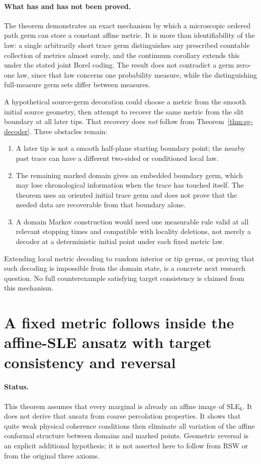 \documentclass[11pt]{article}
\theoremstyle{definition}\newtheorem{definition}[theorem]{Definition}
\theoremstyle{remark}\newtheorem{remark}[theorem]{Remark}
\begin{document}
\paragraph{What has and has not been proved.}
The theorem demonstrates an exact mechanism by which a microscopic ordered
path germ can store a constant affine metric. It is more than identifiability
of the law: a single arbitrarily short trace germ distinguishes any prescribed
countable collection of metrics almost surely, and the continuum corollary
extends this under the stated joint Borel coding. The result does not contradict
a germ zero-one law, since that law concerns one probability measure, while
the distinguishing full-measure germ sets differ between measures.

A hypothetical source-germ decoration could choose a metric from the smooth
initial source geometry, then attempt to recover the same metric from the
slit boundary at all later tips. That recovery does \emph{not} follow from Theorem~\ref{thm:sg-decoder}.
Three obstacles remain:
\begin{enumerate}
\item A later tip is not a smooth half-plane starting boundary point; the
nearby past trace can have a different two-sided or conditioned local law.
\item The remaining marked domain gives an embedded boundary germ, which may
lose chronological information when the trace has touched itself. The theorem
uses an oriented initial trace germ and does not prove that the needed data
are recoverable from that boundary alone.
\item A domain Markov construction would need one measurable rule valid at
all relevant stopping times and compatible with locality deletions, not merely
a decoder at a deterministic initial point under each fixed metric law.
\end{enumerate}
Extending local metric decoding to random interior or tip germs, or proving
that such decoding is impossible from the domain state, is a concrete next
research question. No full counterexample satisfying target consistency is
claimed from this mechanism.

\section{A fixed metric follows inside the affine-SLE ansatz with target consistency and reversal}
\label{sec:affine-ansatz-classification}

\paragraph{Status.}
This theorem assumes that every marginal is already an affine image of
SLE$_6$. It does not derive that ansatz from coarse percolation properties.
It shows that quite weak physical coherence conditions then eliminate all
variation of the affine conformal structure between domains and marked points.
Geometric reversal is an explicit additional hypothesis; it is not asserted
here to follow from RSW or from the original three axioms.
\end{document}
